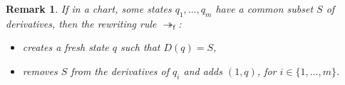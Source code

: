 \documentclass{article}
\newtheorem{remark}[definition]{Remark}
\begin{document}
    \begin{remark}
   If in a chart, some states $q_1,\dots, q_m $ have a common subset
     $S$ of derivatives, then the rewriting rule 
    $\twoheadrightarrow_{\mathsf{f}}$:
    \begin{itemize}
    \item creates a fresh state $q$ such that $D(q)=S$,
    \item removes $S$ from the derivatives of $q_i$ and adds $(1,q)$, for $i\in\{1,\dots,m\}$.
    \end{itemize}
    \end{remark}
   
     
\end{document}
